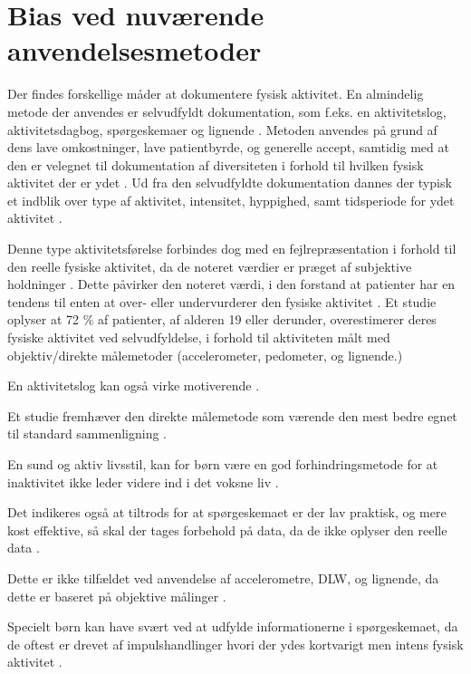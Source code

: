 \section{Bias ved nuværende anvendelsesmetoder}
Der findes forskellige måder at dokumentere fysisk aktivitet. En almindelig metode der anvendes er selvudfyldt dokumentation, som f.eks. en aktivitetslog, aktivitetsdagbog, spørgeskemaer og lignende \citep{adamo2009}. 
Metoden anvendes på grund af dens lave omkostninger, lave patientbyrde, og generelle accept, samtidig med at den er velegnet til dokumentation af diversiteten i forhold til hvilken fysisk aktivitet der er ydet \citep{adamo2009}.
Ud fra den selvudfyldte dokumentation dannes der typisk et indblik over type af aktivitet, intensitet, hyppighed, samt tidsperiode for ydet aktivitet \citep{adamo2009}. 

Denne type aktivitetsførelse forbindes dog med en fejlrepræsentation i forhold til den reelle fysiske aktivitet, da de noteret værdier er præget af subjektive holdninger \citep{adamo2009}. Dette påvirker den noteret værdi, i den forstand at patienter har en tendens til enten at over- eller undervurderer den fysiske aktivitet \citep{adamo2009}.
Et studie oplyser at 72 \% af patienter, af alderen 19 eller derunder, overestimerer deres fysiske aktivitet ved selvudfyldelse, i forhold til aktiviteten målt med objektiv/direkte målemetoder (accelerometer, pedometer, og lignende.) \citep{adamo2009}


En aktivitetslog kan også virke motiverende \citep{adamo2009}.

Et studie fremhæver den direkte målemetode som værende den mest bedre egnet til standard sammenligning \citep{adamo2009}.

En sund og aktiv livsstil, kan for børn være en god forhindringsmetode for at inaktivitet ikke leder videre ind i det voksne liv \citep{adamo2009}. 

Det indikeres også at tiltrods for at spørgeskemaet er der lav praktisk, og mere kost effektive, så skal der tages forbehold på data, da de ikke oplyser den reelle data \citep{adamo2009}. 

Dette er ikke tilfældet ved anvendelse af accelerometre, DLW, og lignende, da dette er baseret på objektive målinger \citep{adamo2009}. 

Specielt børn kan have svært ved at udfylde informationerne i spørgeskemaet, da de oftest er drevet af impulshandlinger hvori der ydes kortvarigt men intens fysisk aktivitet \citep{adamo2009}. 